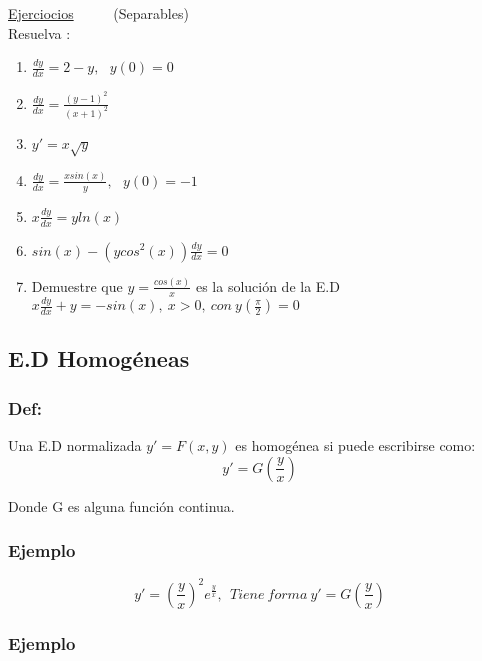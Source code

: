 \documentclass{article}
\begin{document}
\underline{Ejerciocios} \ \ \ \ \  (Separables) \\

Resuelva : 

\begin{enumerate}
\item $\frac{dy}{dx} = 2-y, \ \ \ y\left( 0 \right) = 0 $
\item $\frac{dy}{dx} = \frac{\left( y-1 \right)^2 }{\left( x+1 \right)^2 } $
\item $y' = x \sqrt{y} $
\item $\frac{dy}{dx} = \frac{xsin(x)}{y}, \ \ \ y\left(0 \right) = -1 $
\item $x \frac{dy}{dx} = y ln(x) $
\item $sin(x)- \left( y cos^2(x) \right) \frac{dy}{dx} = 0 $
\item Demuestre que $ y = \frac{cos(x)}{x}$ es la solución de la E.D $x \frac{dy}{dx} + y=-sin(x), \ x > 0,\  con \ y\left(\frac{\pi}{2} \right) = 0  $
\end{enumerate}

\subsection{E.D Homogéneas}

\subsubsection{Def:}

Una E.D normalizada $y' = F(x,y)$ es homogénea si puede escribirse como: \\

\begin{equation}
\nonumber y' = G \left( \frac{y}{x} \right)
\end{equation}

Donde G es alguna función continua.

\subsubsection{Ejemplo}

\begin{equation}
y'  = \left( \frac{y}{x} \right)^2 e^{\frac{y}{x}}, \ \ Tiene \ forma \  y' = G \left( \frac{y}{x} \right)
\end{equation}

\subsubsection{Ejemplo}
\end{document}
